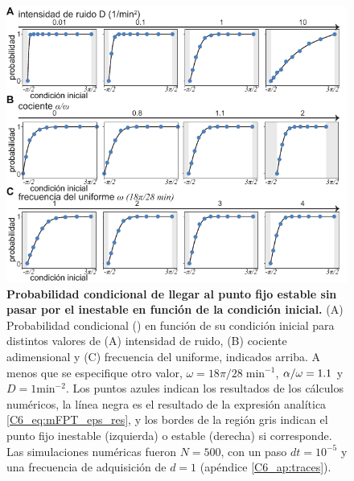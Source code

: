 \documentclass[./main.tex]{subfiles}
\begin{document}
\begin{figure}
    \centering
    \includegraphics[width=1\columnwidth]{figures/chapter6/C6_eps_plus.pdf} 
    \caption{\textbf{Probabilidad condicional de llegar al punto fijo estable sin pasar por el inestable en función de la condición inicial.} (A) Probabilidad condicional \epsplus(\xx) en función de su condición inicial \xx para distintos valores de (A) intensidad de ruido, (B) cociente adimensional \dddelta y (C) frecuencia del uniforme, indicados arriba. A menos que se especifique otro valor, $\omega = 18\pi/28 \; \text{min}^{-1}$, $\alpha/\omega = 1.1$ y $D=1 \text{min}^{-2}$. Los puntos azules indican los resultados de los cálculos numéricos, la línea negra es el resultado de la expresión analítica \ref{C6_eq:mFPT_eps_res}, y los bordes de la región gris indican el punto fijo inestable (izquierda) o estable (derecha) si corresponde. Las simulaciones numéricas fueron $N=500$, con un paso $dt = 10^{-5}$ y una frecuencia de adquisición de $d=1$ (apéndice \ref{C6_ap:traces}).}
    \label{C6_fig:mFPT_eps}
\end{figure}
\end{document}
